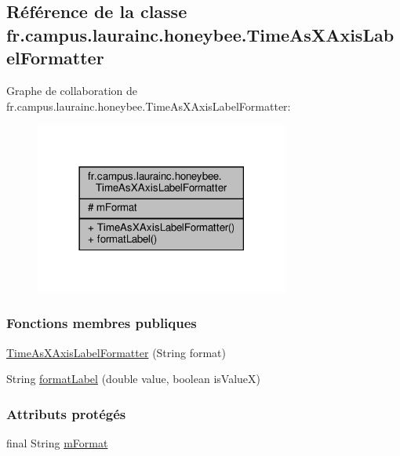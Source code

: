 \hypertarget{classfr_1_1campus_1_1laurainc_1_1honeybee_1_1_time_as_x_axis_label_formatter}{}\subsection{Référence de la classe fr.\+campus.\+laurainc.\+honeybee.\+Time\+As\+X\+Axis\+Label\+Formatter}
\label{classfr_1_1campus_1_1laurainc_1_1honeybee_1_1_time_as_x_axis_label_formatter}


Graphe de collaboration de fr.\+campus.\+laurainc.\+honeybee.\+Time\+As\+X\+Axis\+Label\+Formatter\+:\nopagebreak
\begin{figure}[H]
\begin{center}
\leavevmode
\includegraphics[width=237pt]{classfr_1_1campus_1_1laurainc_1_1honeybee_1_1_time_as_x_axis_label_formatter__coll__graph}
\end{center}
\end{figure}
\subsubsection*{Fonctions membres publiques}
\begin{DoxyCompactItemize}
\item 
\hyperlink{classfr_1_1campus_1_1laurainc_1_1honeybee_1_1_time_as_x_axis_label_formatter_acbd836cc0a90b8328a397db78a9cb082}{Time\+As\+X\+Axis\+Label\+Formatter} (String format)
\item 
String \hyperlink{classfr_1_1campus_1_1laurainc_1_1honeybee_1_1_time_as_x_axis_label_formatter_a2f5c7f8b098eb1bc82f7a47e39088820}{format\+Label} (double value, boolean is\+ValueX)
\end{DoxyCompactItemize}
\subsubsection*{Attributs protégés}
\begin{DoxyCompactItemize}
\item 
final String \hyperlink{classfr_1_1campus_1_1laurainc_1_1honeybee_1_1_time_as_x_axis_label_formatter_ab6093f1dff2db01144543e00bb1b2700}{m\+Format}
\end{DoxyCompactItemize}


